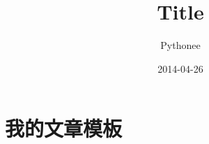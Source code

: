 \documentclass[cap,cs4size,nospace,indent,hyperref,fancyhdr,adobefonts]{ctexart}
\author{Pythonee}
\title{Title}
\date{2014-04-26}
\begin{document}
\pagestyle{plain}
\maketitle
\tableofcontents
\section{我的文章模板}
\lipsum
\end{document}
